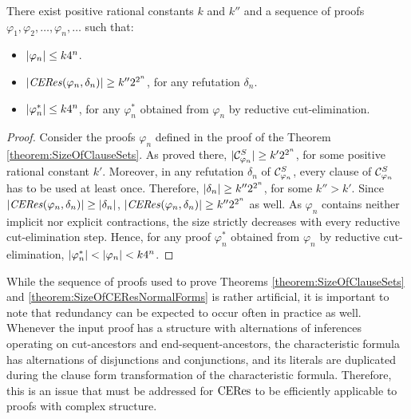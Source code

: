 \begin{theorem}
\label{theorem:SizeOfCEResNormalForms}
There exist positive rational constants $k$ and $k''$ and a sequence of proofs $\varphi_1, \varphi_2, \ldots, \varphi_n, \ldots$ such that:
\begin{itemize}
\item $|\varphi_n| \leq k 4^n$.
\item $|\mathit{CERes}(\varphi_n,\delta_n)| \geq k'' 2^{2^n}$, for any refutation $\delta_n$.
\item $|\varphi_n^*| \leq k 4^n$, for any $\varphi_n^*$ obtained from $\varphi_n$ by reductive cut-elimination.
\end{itemize}
\end{theorem}
\begin{proof}
Consider the proofs $\varphi_n$ defined in the proof of the Theorem \ref{theorem:SizeOfClauseSets}. As proved there, 
$|\mathcal{C}^S_{\varphi_n}| \geq k' 2^{2^n}$, for some positive rational constant $k'$. Moreover, in any refutation $\delta_n$ of $\mathcal{C}^S_{\varphi_n}$, every clause of $\mathcal{C}^S_{\varphi_n}$ has to be used at least once. Therefore, $|\delta_n| \geq k'' 2^{2^n}$, for some $k'' > k'$. Since $|\mathit{CERes}(\varphi_n,\delta_n)| \geq |\delta_n|$, $|\mathit{CERes}(\varphi_n,\delta_n)| \geq k'' 2^{2^n}$ as well. As $\varphi_n$ contains neither implicit nor explicit contractions, the size strictly decreases with every reductive cut-elimination step. Hence, for any proof $\varphi_n^*$ obtained from $\varphi_n$ by reductive cut-elimination, $|\varphi_n^*| < |\varphi_n| < k 4^n$.
\hfill\QED
\end{proof}

\noindent
While the sequence of proofs used to prove Theorems \ref{theorem:SizeOfClauseSets} and \ref{theorem:SizeOfCEResNormalForms} is rather artificial, it is important to note that redundancy can be expected to occur often in practice as well. Whenever the input proof has a structure with alternations of inferences operating on cut-ancestors and end-sequent-ancestors, the characteristic formula has alternations of disjunctions and conjunctions, and its literals are duplicated during the clause form transformation of the characteristic formula. Therefore, this is an issue that must be addressed for $\mathrm{CERes}$ to be efficiently applicable to proofs with complex structure.
